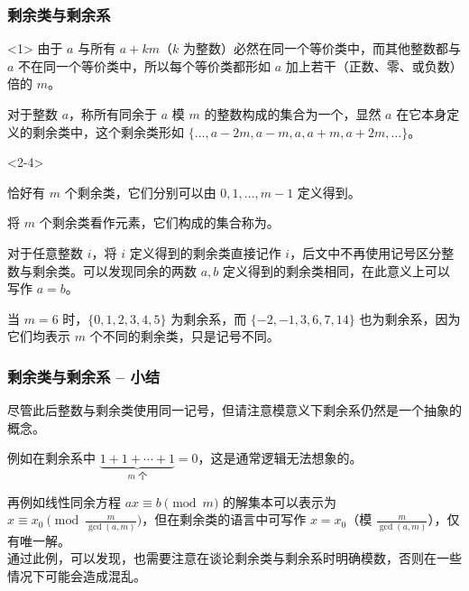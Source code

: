 \documentclass{../pkslide}
\begin{document}
\begin{frame}
  \frametitle{剩余类与剩余系}
  \begin{onlyenv}<1>
    由于 $a$ 与所有 $a + k m$（$k$ 为整数）必然在同一个等价类中，而其他整数都与 $a$ 不在同一个等价类中，所以每个等价类都形如 $a$ 加上若干（正数、零、或负数）倍的 $m$。
    
    \begin{definition}[剩余类]
      对于整数 $a$，称所有同余于 $a$ 模 $m$ 的整数构成的集合为一个，显然 $a$ 在它本身定义的剩余类中，这个剩余类形如 $\{ \ldots, a - 2 m, a - m, a, a + m, a + 2 m, \ldots \}$。
    \end{definition}
  \end{onlyenv}
  
  \pause
  \begin{onlyenv}<2-4>
    \begin{definition}[剩余系]
      恰好有 $m$ 个剩余类，它们分别可以由 $0, 1, \ldots, m - 1$ 定义得到。
      
      将 $m$ 个剩余类看作元素，它们构成的集合称为。
      
      \pause
      对于任意整数 $i$，将 $i$ 定义得到的剩余类直接记作 $i$，后文中不再使用记号区分整数与剩余类。可以发现同余的两数 $a, b$ 定义得到的剩余类相同，在此意义上可以写作 $a = b$。
    \end{definition}
    
    \pause
    \begin{example}[剩余系]
      当 $m = 6$ 时，$\{ 0, 1, 2, 3, 4, 5 \}$ 为剩余系，而 $\{ -2, -1, 3, 6, 7, 14 \}$ 也为剩余系，因为它们均表示 $m$ 个不同的剩余类，只是记号不同。
    \end{example}
  \end{onlyenv}
\end{frame}

\begin{frame}
  \frametitle{剩余类与剩余系 -- 小结}
  尽管此后整数与剩余类使用同一记号，但请注意模意义下剩余系仍然是一个抽象的概念。
  
  例如在剩余系中 $\underbrace{1 + 1 + \cdots + 1}_{m \text{ 个}} = 0$，这是通常逻辑无法想象的。
  
  再例如线性同余方程 $a x \equiv b \pmod{m}$ 的解集本可以表示为 $x \equiv x_0 \pmod{\frac{m}{\gcd(a, m)}}$，但在剩余类的语言中可写作 $x = x_0$（模 $\frac{m}{\gcd(a, m)}$），仅有唯一解。\\
  通过此例，可以发现，也需要注意在谈论剩余类与剩余系时明确模数，否则在一些情况下可能会造成混乱。
\end{frame}
\end{document}
